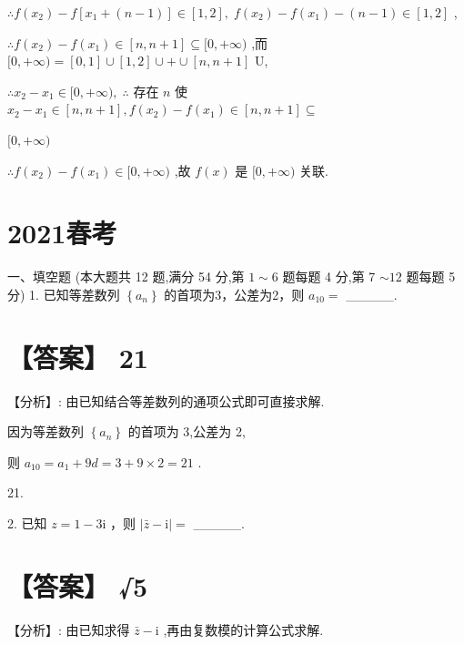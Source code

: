 \documentclass[10pt]{article}
\begin{document}
\(\therefore f\left( {x}_{2}\right)  - f\left\lbrack  {{x}_{1} + \left( {n - 1}\right) }\right\rbrack   \in  \left\lbrack  {1,2}\right\rbrack  ,\;f\left( {x}_{2}\right)  - f\left( {x}_{1}\right)  - \left( {n - 1}\right)  \in  \left\lbrack  {1,2}\right\rbrack\) ,

\(\therefore f\left( {x}_{2}\right)  - f\left( {x}_{1}\right)  \in  \left\lbrack  {n,n + 1}\right\rbrack   \subseteq  \lbrack 0, + \infty )\) ,而 \(\lbrack 0, + \infty ) = \left\lbrack  {0,1}\right\rbrack   \cup  \left\lbrack  {1,2}\right\rbrack   \cup   +  \cup  \left\lbrack  {n,n + 1}\right\rbrack\) U,

\(\therefore {x}_{2} - {x}_{1} \in  \lbrack 0, + \infty ),\;\therefore\) 存在 \(n\) 使 \({x}_{2} - {x}_{1} \in  \left\lbrack  {n,n + 1}\right\rbrack  ,f\left( {x}_{2}\right)  - f\left( {x}_{1}\right)  \in  \left\lbrack  {n,n + 1}\right\rbrack   \subseteq\)

\(\lbrack 0, + \infty )\)

\(\therefore f\left( {x}_{2}\right)  - f\left( {x}_{1}\right)  \in  \lbrack 0, + \infty )\) ,故 \(f\left( x\right)\) 是 \(\lbrack 0, + \infty )\) 关联.

\section*{2021春考}

一、填空题 (本大题共 12 题,满分 54 分,第 \(1 \sim  6\) 题每题 4 分,第 7 \(\sim  {12}\) 题每题 5 分) 1. 已知等差数列 \(\left\{  {a}_{n}\right\}\) 的首项为3，公差为2，则 \({a}_{10} =\) \_\_\_\_\_.

\section*{【答案】 21}

【分析】: 由已知结合等差数列的通项公式即可直接求解.

因为等差数列 \(\left\{  {a}_{n}\right\}\) 的首项为 3,公差为 2,

则 \({a}_{10} = {a}_{1} + {9d} = 3 + 9 \times  2 = {21}\) .

21.

2. 已知 \(z = 1 - 3\mathrm{i}\) ，则 \(\left| {\bar{z} - \mathrm{i}}\right|  =\) \_\_\_\_\_.

\section*{【答案】 √5}

【分析】: 由已知求得 \(\bar{z} - \mathrm{i}\) ,再由复数模的计算公式求解.
\end{document}
